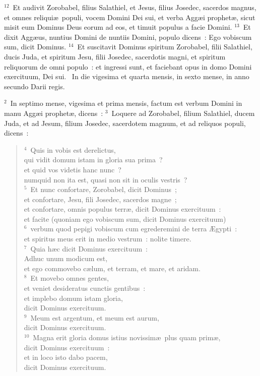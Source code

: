 ${}^{12}$~Et audivit Zorobabel, filius Salathiel, et Jesus, filius Josedec, sacerdos magnus, et omnes reliqui\ae\ populi, vocem Domini Dei sui, et verba Agg\ae i prophet\ae , sicut misit eum Dominus Deus eorum ad eos, et timuit populus a facie Domini.
${}^{13}$~Et dixit Agg\ae us, nuntius Domini de nuntiis Domini, populo dicens~: Ego vobiscum sum, dicit Dominus.
${}^{14}$~Et suscitavit Dominus spiritum Zorobabel, filii Salathiel, ducis Juda, et spiritum Jesu, filii Josedec, sacerdotis magni, et spiritum reliquorum de omni populo~: et ingressi sunt, et faciebant opus in domo Domini exercituum, Dei sui.
~In die vigesima et quarta mensis, in sexto mense, in anno secundo Darii regis.


${}^{2}$~In septimo mense, vigesima et prima mensis, factum est verbum Domini in manu Agg\ae i prophet\ae , dicens~:
${}^{3}$~Loquere ad Zorobabel, filium Salathiel, ducem Juda, et ad Jesum, filium Josedec, sacerdotem magnum, et ad reliquos populi, dicens~:
\begin{flushleft}\begin{verse}${}^{4}$~Quis in vobis est derelictus,\\ qui vidit domum istam in gloria sua prima~?\\ et quid vos videtis hanc nunc~?\\ numquid non ita est, quasi non sit in oculis vestris~?\\
${}^{5}$~Et nunc confortare, Zorobabel, dicit Dominus~;\\ et confortare, Jesu, fili Josedec, sacerdos magne~;\\ et confortare, omnis populus terr\ae , dicit Dominus exercituum~:\\ et facite (quoniam ego vobiscum sum, dicit Dominus exercituum)\\
${}^{6}$~verbum quod pepigi vobiscum cum egrederemini de terra \AE gypti~:\\ et spiritus meus erit in medio vestrum~: nolite timere.\\
${}^{7}$~Quia h\ae c dicit Dominus exercituum~:\\ Adhuc unum modicum est,\\ et ego commovebo c\ae lum, et terram, et mare, et aridam.\\
${}^{8}$~Et movebo omnes gentes,\\ et veniet desideratus cunctis gentibus~:\\ et implebo domum istam gloria,\\ dicit Dominus exercituum.\\
${}^{9}$~Meum est argentum, et meum est aurum,\\ dicit Dominus exercituum.\\
${}^{10}$~Magna erit gloria domus istius novissim\ae\ plus quam prim\ae ,\\ dicit Dominus exercituum~:\\ et in loco isto dabo pacem,\\ dicit Dominus exercituum.\end{verse}\end{flushleft}


